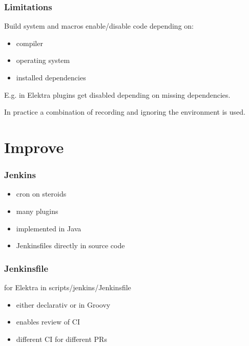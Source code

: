 \begin{frame}
	\frametitle{Limitations}

	Build system and macros enable/disable code depending on:

	\begin{itemize}
	\item compiler
	\item operating system
	\item installed dependencies
	\end{itemize}

	E.g. in Elektra plugins get disabled depending on missing dependencies.

	\pause
	\vspace{1cm}

	\begin{solution}
	In practice a combination of recording and ignoring the environment is used.
	\end{solution}
\end{frame}

\section{Improve}

\begin{frame}
	\frametitle{Jenkins}

	\begin{itemize}[<+-| alert@+>]

	\item cron on steroids
	\item many plugins
	\item implemented in Java
	\item Jenkinsfiles directly in source code
	\end{itemize}
\end{frame}

\begin{frame}
	\frametitle{Jenkinsfile}

	for Elektra in scripts/jenkins/Jenkinsfile

	\begin{itemize}[<+-| alert@+>]

	\item either declarativ or in Groovy
	\item enables review of CI
	\item different CI for different PRs
	\end{itemize}
\end{frame}

